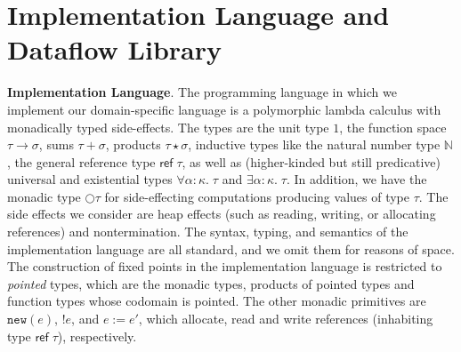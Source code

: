 \documentclass[nocopyrightspace,preprint]{sigplanconf}
\newcommand{\N}{\mathbb{N}}
\newcommand{\newref}[1]{\term{new}({#1})}
\newcommand{\term}[1]{\ensuremath{\mathtt{{#1}}}}
\newcommand{\reftype}[1]{\mathsf{ref}\;{#1}}
\newcommand{\monad}[1]{\bigcirc{#1}}
\newcommand{\suspend}[1]{[{#1}]}
\newcommand{\fix}[2]{\term{fix}\;{#1}.\;{#2}}
\begin{document}
\section{Implementation Language and Dataflow Library}

\noindent\textbf{Implementation Language}. The programming language
in which we implement our domain-specific language is a 
polymorphic lambda calculus with monadically typed 
side-effects.  The types are
the unit type $1$, the function space $\tau \to \sigma$, sums $\tau +
\sigma$, products $\tau \star \sigma$, inductive types like the
natural number type $\N$, the general reference type $\reftype{\tau}$,
as well as (higher-kinded but still predicative) universal and
existential types $\forall \alpha:\kappa.\;\tau$ and $\exists
\alpha:\kappa.\;\tau$. In addition, we have the monadic type
$\monad{\tau}$ for side-effecting
computations producing values of type $\tau$. The side effects we
consider are heap effects (such as reading, writing, or allocating
references) and nontermination.
The syntax, typing, and semantics of the implementation
language are all standard, and we omit them for reasons of space. The construction of fixed points in the implementation language is restricted to \emph{pointed} types, which are the monadic types, products of pointed types and function types whose codomain is pointed. The other monadic primitives are 
$\newref{e}$, $!e$, and $e := e'$,
which allocate, read and write references (inhabiting type
$\reftype{\tau}$), respectively. 

\end{document}
